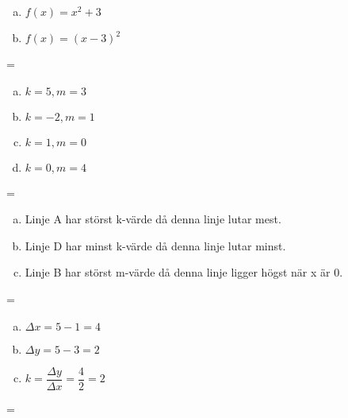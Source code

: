\documentclass {article}
\newenvironment{absolutelynopagebreak}
  {\par\nobreak\vfil\penalty0\vfilneg
   \vtop\bgroup}
  {\par\xdef\tpd{\the\prevdepth}\egroup
   \prevdepth=\tpd}
\begin{document}
\begin{absolutelynopagebreak}
\begin{enumerate}[a)]
\item $f(x) = x^2 + 3$
\item $f(x) = (x - 3)^2$
\end{enumerate}
\end{absolutelynopagebreak}

\begin{absolutelynopagebreak}
\begin{enumerate}[a)]
\item $k = 5, m = 3$
\item $k = -2, m = 1$
\item $k = 1, m = 0$
\item $k = 0, m = 4$
\end{enumerate}
\end{absolutelynopagebreak}

\begin{absolutelynopagebreak}
\begin{enumerate}[a)]
\item Linje A har störst k-värde då denna linje lutar mest.
\item Linje D har minst k-värde då denna linje lutar minst.
\item Linje B har störst m-värde då denna linje ligger högst när x är 0.
\end{enumerate}
\end{absolutelynopagebreak}

\begin{absolutelynopagebreak}
\begin{enumerate}[a)]
\item $\Delta x = 5 - 1 = 4$
\item $\Delta y = 5 - 3 = 2$
\item $k = \dfrac{\Delta y}{\Delta x} = \dfrac{4}{2} = 2$
\end{enumerate}
\end{absolutelynopagebreak}
\end{document}
